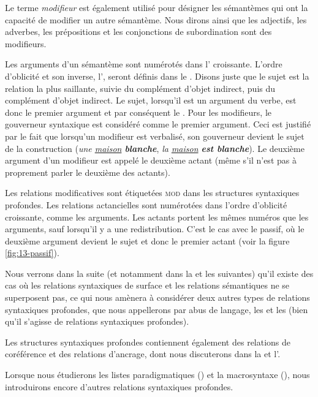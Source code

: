 Le terme \textit{modifieur} est également utilisé pour désigner les sémantèmes qui ont la capacité de modifier un autre sémantème. Nous dirons ainsi que les adjectifs, les adverbes, les prépositions et les conjonctions de subordination sont des modifieurs.

Les arguments d’un sémantème sont numérotés dans l’ croissante. L’ordre d’oblicité et son inverse, l’, seront définis dans le . Disons juste que le sujet est la relation la plus saillante, suivie du complément d’objet indirect, puis du complément d’objet indirect. Le sujet, lorsqu'il est un argument du verbe, est donc le premier argument et par conséquent le . Pour les modifieurs, le gouverneur syntaxique est considéré comme le premier argument. Ceci est justifié par le fait que lorsqu’un modifieur est verbalisé, son gouverneur devient le sujet de la construction (\textit{une \underline{maison} \textbf{blanche}}, \textit{la \underline{maison} \textbf{est blanche}}). Le deuxième argument d’un modifieur est appelé le deuxième actant (même s’il n’est pas à proprement parler le deuxième des actants).

Les relations modificatives sont étiquetées \textsc{mod} dans les structures syntaxiques profondes. Les relations actancielles sont numérotées dans l’ordre d’oblicité croissante, comme les arguments. Les actants portent les mêmes numéros que les arguments, sauf lorsqu'il y a une redistribution. C'est le cas avec le passif, où le deuxième argument devient le sujet et donc le premier actant (voir la figure \ref{fig:13-passif}).

Nous verrons dans la suite (et notamment dans la  et les suivantes) qu’il existe des cas où les relations syntaxiques de surface et les relations sémantiques ne se superposent pas, ce qui nous amènera à considérer deux autres types de relations syntaxiques profondes, que nous appellerons par abus de langage, les  et les  (bien qu'il s'agisse de relations syntaxiques profondes).

Les structures syntaxiques profondes contiennent également des relations de coréférence et des relations d’ancrage, dont nous discuterons dans la  et l’.

Lorsque nous étudierons les listes paradigmatiques () et la macrosyntaxe (), nous introduirons encore d’autres relations syntaxiques profondes.

